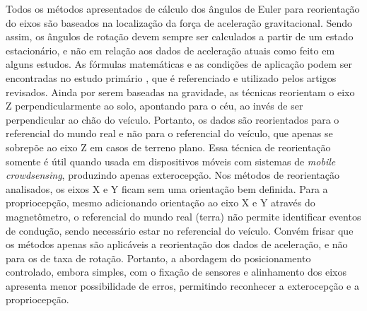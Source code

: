 Todos os métodos apresentados de cálculo dos ângulos de Euler para reorientação do eixos são baseados na localização da força de aceleração gravitacional. Sendo assim, os ângulos de rotação devem sempre ser calculados a partir de um estado estacionário, e não em relação aos dados de aceleração atuais como feito em alguns estudos. As fórmulas matemáticas e as condições de aplicação podem ser encontradas no estudo primário \cite{Astarita2012}, que é referenciado e utilizado pelos artigos revisados. Ainda por serem baseadas na gravidade, as técnicas reorientam o eixo Z perpendicularmente ao solo, apontando para o céu, ao invés de ser perpendicular ao chão do veículo. Portanto, os dados são reorientados para o referencial do mundo real e não para o referencial do veículo, que apenas se sobrepõe ao eixo Z em casos de terreno plano. Essa técnica de reorientação somente é útil quando usada em dispositivos móveis com sistemas de \textit{mobile crowdsensing}, produzindo apenas exterocepção. Nos métodos de reorientação analisados, os eixos X e Y ficam sem uma orientação bem definida. Para a propriocepção, mesmo adicionando orientação ao eixo X e Y através do magnetômetro, o referencial do mundo real (terra) não permite identificar eventos de condução, sendo necessário estar no referencial do veículo. Convém frisar que os métodos apenas são aplicáveis a reorientação dos dados de aceleração, e não para os de taxa de rotação. Portanto, a abordagem do posicionamento controlado, embora simples, com o fixação de sensores e alinhamento dos eixos apresenta menor possibilidade de erros, permitindo reconhecer a exterocepção e a propriocepção.

